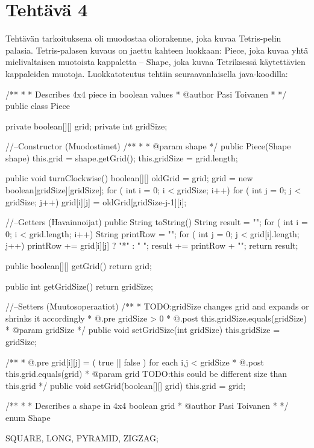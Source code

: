 
\chapter{Tehtävä 4 \label{chap:Teht=0000E4v=0000E4-1}}

Tehtävän tarkoituksena oli muodostaa oliorakenne, joka kuvaa Tetris-pelin
palasia. Tetris-palasen kuvaus on jaettu kahteen luokkaan: Piece, joka kuvaa
yhtä mielivaltaisen muotoista kappaletta – Shape, joka kuvaa Tetriksessä
käytettävien kappaleiden muotoja. Luokkatoteutus tehtiin seuraavanlaisella
java-koodilla:

\begin{javacode}
/**
 * 
 * Describes 4x4 piece in boolean values
 * @author Pasi Toivanen
 *
 */
public class Piece {

	private boolean[][] grid;
	private int gridSize;
	
//--Constructor (Muodostimet)
	/**
	 * 
	 * @param shape
	 */
	public Piece(Shape shape) {
		this.grid = shape.getGrid();
		this.gridSize = grid.length;
	}
	
	public void turnClockwise() {
		boolean[][] oldGrid = grid;
		grid = new boolean[gridSize][gridSize];
		for ( int i = 0; i < gridSize; i++) {
			for ( int j = 0; j < gridSize; j++) {
				grid[i][j] = oldGrid[gridSize-j-1][i];
			}
		}
	}
	
//--Getters (Havainnoijat)
	public String toString() {
		String result = "";
		for ( int i = 0; i < grid.length; i++) {
			String printRow = "";
			for ( int j = 0; j < grid[i].length; j++) {
				printRow += grid[i][j] ? "*" : " ";
			}
			result += printRow + "\n";
		}
		return result;
	}
	
	public boolean[][] getGrid() {
		return grid;
	}

	public int getGridSize() {
		return gridSize;
	}

//--Setters (Muutosoperaatiot)
	/**
	 * TODO:gridSize changes grid and expands or shrinks it accordingly
	 * @.pre gridSize > 0
	 * @.post this.gridSize.equals(gridSize)
	 * @param gridSize
	 */
	public void setGridSize(int gridSize) {
		this.gridSize = gridSize;
	}
	
	/**
	 * @.pre grid[i][j] = ( true || false ) for each i,j < gridSize
	 * @.post this.grid.equals(grid)
	 * @param grid TODO:this could be different size than this.grid
	 */
	public void setGrid(boolean[][] grid) {
		this.grid = grid;
	}

}

/**
 * 
 * Describes a shape in 4x4 boolean grid
 * @author Pasi Toivanen
 *
 */
enum Shape {
	SQUARE,
	LONG,
	PYRAMID,
	ZIGZAG;
	
}
\end{javacode}
